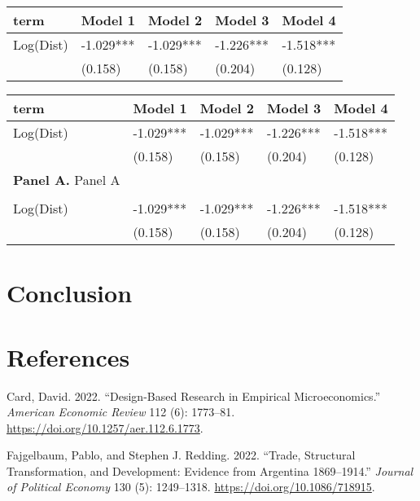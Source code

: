 \documentclass[
  12pt,
]{article}
\newlength{\cslhangindent}
\newlength{\cslentryspacingunit} %
\newenvironment{CSLReferences}[2] %
 {%
  \setlength{\parindent}{0pt}
  \ifodd #1
  \let\oldpar\par
  \def\par{\hangindent=\cslhangindent\oldpar}
  \fi
  \setlength{\parskip}{#2\cslentryspacingunit}
 }%
 {}
\begin{document}
\begin{tabular}{lllll}
\toprule
term & Model 1 & Model 2 & Model 3 & Model 4\\
\midrule
Log(Dist) & -1.029*** & -1.029*** & -1.226*** & -1.518***\\
 & (0.158) & (0.158) & (0.204) & (0.128)\\
\bottomrule
\end{tabular}

\begin{tabular}{lllll}
\toprule
term & Model 1 & Model 2 & Model 3 & Model 4\\
\midrule
Log(Dist) & -1.029*** & -1.029*** & -1.226*** & -1.518***\\
 & (0.158) & (0.158) & (0.204) & (0.128)\\
\textbf{Panel A.} Panel A \\
  \\[-7pt]
Log(Dist) & -1.029*** & -1.029*** & -1.226*** & -1.518***\\
 & (0.158) & (0.158) & (0.204) & (0.128)\\
\bottomrule
\end{tabular}

\hypertarget{conclusion}{%
\section{Conclusion}\label{conclusion}}

\hypertarget{references}{%
\section*{References}\label{references}}

\hypertarget{refs_main}{}
\begin{CSLReferences}{1}{0}
\leavevmode{}%
Card, David. 2022. {``Design-{Based} {Research} in {Empirical} {Microeconomics}.''} \emph{American Economic Review} 112 (6): 1773--81. \url{https://doi.org/10.1257/aer.112.6.1773}.

\leavevmode{}%
Fajgelbaum, Pablo, and Stephen J. Redding. 2022. {``Trade, {Structural} {Transformation}, and {Development}: {Evidence} from {Argentina} 1869--1914.''} \emph{Journal of Political Economy} 130 (5): 1249--1318. \url{https://doi.org/10.1086/718915}.

\end{CSLReferences}
\end{document}
